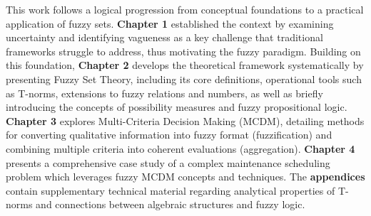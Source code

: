 This work follows a logical progression from conceptual foundations to a practical application of fuzzy sets. \textbf{Chapter 1} established the context by examining uncertainty and identifying vagueness as a key challenge that traditional frameworks struggle to address, thus motivating the fuzzy paradigm. Building on this foundation, \textbf{Chapter 2} develops the theoretical framework systematically by presenting Fuzzy Set Theory, including its core definitions, operational tools such as T-norms, extensions to fuzzy relations and numbers, as well as briefly introducing the concepts of possibility measures and fuzzy propositional logic. \textbf{Chapter 3} explores Multi-Criteria Decision Making (MCDM), detailing methods for converting qualitative information into fuzzy format (fuzzification) and combining multiple criteria into coherent evaluations (aggregation). \textbf{Chapter 4} presents a comprehensive case study of a complex maintenance scheduling problem which leverages fuzzy MCDM concepts and techniques. The \textbf{appendices} contain supplementary technical material regarding analytical properties of T-norms and connections between algebraic structures and fuzzy logic.





